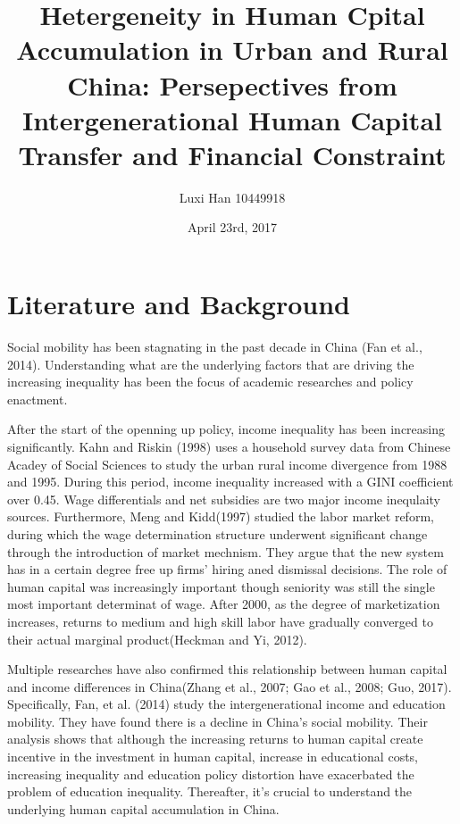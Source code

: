 \documentclass[12pt]{article}%
\title{Hetergeneity in Human Cpital Accumulation in Urban and Rural China: Persepectives from Intergenerational Human Capital Transfer and Financial Constraint}
\author{Luxi Han 10449918}
\date{April 23rd, 2017}
\theoremstyle{definition}
\numberwithin{equation}{section}
\begin{document}
\maketitle

\section{Literature and Background}
Social mobility has been stagnating in the past decade in China (Fan et al., 2014). Understanding what are the underlying factors that are driving the increasing inequality has been the focus of academic researches and policy enactment. 

After the start of the openning up policy, income inequality has been increasing significantly. Kahn and Riskin (1998) uses a household survey data from Chinese Acadey of Social Sciences to study the urban rural income divergence from 1988 and 1995. During this period, income inequality increased with a GINI coefficient over 0.45. Wage differentials and net subsidies are two major income inequlaity sources. Furthermore, Meng and Kidd(1997) studied the labor market reform, during which the wage determination structure underwent significant change through the introduction of market mechnism. They argue that the new system has in a certain degree free up firms' hiring aned dismissal decisions. The role of human capital was increasingly important though seniority was still the single most important determinat of wage. After 2000, as the degree of marketization increases, returns to medium and high skill labor have gradually converged to their actual marginal product(Heckman and Yi, 2012).

Multiple researches have also confirmed this relationship between human capital and income differences in China(Zhang et al., 2007; Gao et al., 2008; Guo, 2017). Specifically, Fan, et al. (2014) study the intergenerational income and education mobility.  They have found there is a decline in China’s social mobility. Their analysis shows that although the increasing returns to human capital create incentive in the investment in human capital, increase in educational costs, increasing inequality and education policy distortion have exacerbated the problem of education inequality. Thereafter, it’s crucial to understand the underlying human capital accumulation in China.\par
\end{document}
